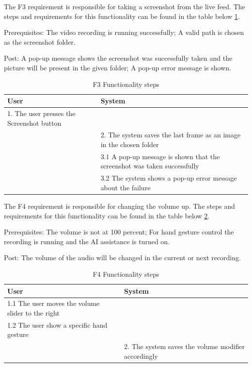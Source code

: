 \par The F3 requirement is responsible for taking a screenshot from the live feed. The steps and requirements for this functionality can be found in the table below \ref{F3Table}.
\par Prerequisites: The video recording is running successfully; A valid path is chosen as the screenshot folder.
\par Post: A pop-up message shows the screenshot was successfully taken and the picture will be present in the given folder; A pop-up error message is shown.

\begin{table}[htbp]
\begin{center}
\begin{tabular}
{|p{180pt}|p{180pt}|}
\hline
 User & System\\
\hline 
\hline 1. The user presses the Screenshot button &  \\
\hline  & 2. The system saves the last frame as an image in the chosen folder \\
\hline  & 3.1 A pop-up message is shown that the screenshot was taken successfully \\
\hline  & 3.2 The system shows a pop-up error message about the failure \\
\hline
\end{tabular}
\end{center}
\caption{F3 Functionality steps}
\label{F3Table}
\end{table}

\par The F4 requirement is responsible for changing the volume up. The steps and requirements for this functionality can be found in the table below \ref{F4Table}.
\par Prerequisites: The volume is not at 100 percent; For hand gesture control the recording is running and the AI assistance is turned on.
\par Post: The volume of the audio will be changed in the current or next recording.

\begin{table}[htbp]
\begin{center}
\begin{tabular}
{|p{180pt}|p{180pt}|}
\hline
 User & System\\
\hline 
\hline 1.1 The user moves the volume slider to the right &  \\
\hline 1.2 The user show a specific hand gesture &  \\
\hline  & 2. The system saves the volume modifier accordingly \\
\hline
\end{tabular}
\end{center}
\caption{F4 Functionality steps}
\label{F4Table}
\end{table}

